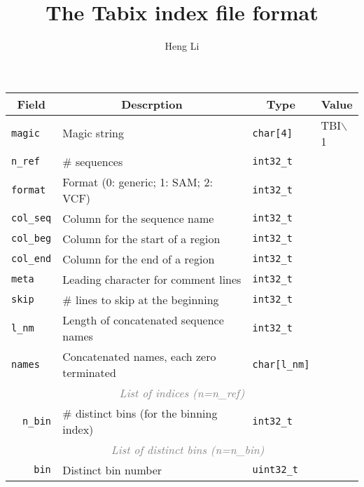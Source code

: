 \documentclass[10pt]{article}
\begin{document}
\title{The Tabix index file format}
\author{Heng Li}
\date{}

\maketitle

\begin{center}
\begin{tabular}{|l|l|l|l|l|l|l|}
\hline
\multicolumn{4}{|c|}{\bf Field} & \multicolumn{1}{c|}{\bf Descrption} & \multicolumn{1}{c|}{\bf Type} & \multicolumn{1}{c|}{\bf Value} \\
\hline\hline
\multicolumn{4}{|l|}{\tt magic} & Magic string & {\tt char[4]} & TBI$\backslash$1 \\
\hline
\multicolumn{4}{|l|}{\tt n\_ref} & \# sequences & {\tt int32\_t} & \\
\hline
\multicolumn{4}{|l|}{\tt format} & Format (0: generic; 1: SAM; 2: VCF) & {\tt int32\_t} & \\
\hline
\multicolumn{4}{|l|}{\tt col\_seq} & Column for the sequence name & {\tt int32\_t} & \\
\hline
\multicolumn{4}{|l|}{\tt col\_beg} & Column for the start of a region & {\tt int32\_t} & \\
\hline
\multicolumn{4}{|l|}{\tt col\_end} & Column for the end of a region & {\tt int32\_t} & \\
\hline
\multicolumn{4}{|l|}{\tt meta} & Leading character for comment lines & {\tt int32\_t} & \\
\hline
\multicolumn{4}{|l|}{\tt skip} & \# lines to skip at the beginning & {\tt int32\_t} & \\
\hline
\multicolumn{4}{|l|}{\tt l\_nm} & Length of concatenated sequence names & {\tt int32\_t} & \\
\hline
\multicolumn{4}{|l|}{\tt names} & Concatenated names, each zero terminated & {\tt char[l\_nm]} & \\
\hline
\multicolumn{7}{|c|}{\textcolor{gray}{\it List of indices (n=n\_ref)}}\\
\cline{2-7}
\hspace{0.1cm} & \multicolumn{3}{l|}{\tt n\_bin} & \# distinct bins (for the binning index) & {\tt int32\_t} & \\
\cline{2-7}
 & \multicolumn{6}{c|}{\textcolor{gray}{\it List of distinct bins (n=n\_bin)}} \\
\cline{3-7}
 & \hspace{0.1cm} & \multicolumn{2}{l|}{\tt bin} & Distinct bin number & {\tt uint32\_t} & \\

\end{tabular}
\end{center}
\end{document}

